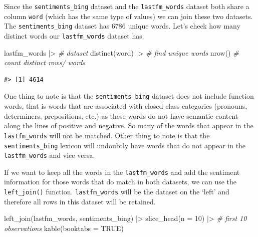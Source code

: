\documentclass[
  letterpaper,
]{scrbook}
\newenvironment{Shaded}{\begin{snugshade}}{\end{snugshade}}
\newcommand{\AttributeTok}[1]{\textcolor[rgb]{0.00,0.00,0.00}{#1}}
\newcommand{\CommentTok}[1]{\textcolor[rgb]{0.00,0.00,0.00}{\textit{#1}}}
\newcommand{\ConstantTok}[1]{\textcolor[rgb]{0.00,0.00,0.00}{#1}}
\newcommand{\DecValTok}[1]{\textcolor[rgb]{0.00,0.00,0.00}{#1}}
\newcommand{\FunctionTok}[1]{\textcolor[rgb]{0.00,0.00,0.00}{#1}}
\newcommand{\NormalTok}[1]{\textcolor[rgb]{0.00,0.00,0.00}{#1}}
\newcommand{\SpecialCharTok}[1]{\textcolor[rgb]{0.00,0.00,0.00}{#1}}
\begin{document}
Since the \texttt{sentiments\_bing} dataset and the
\texttt{lastfm\_words} dataset both share a column \texttt{word} (which
has the same type of values) we can join these two datasets. The
\texttt{sentiments\_bing} dataset has 6786 unique words. Let's check how
many distinct words our \texttt{lastfm\_words} dataset has.

\begin{Shaded}
\begin{Highlighting}[]
\NormalTok{lastfm\_words }\SpecialCharTok{|\textgreater{}} \CommentTok{\# dataset}
  \FunctionTok{distinct}\NormalTok{(word) }\SpecialCharTok{|\textgreater{}} \CommentTok{\# find unique words}
  \FunctionTok{nrow}\NormalTok{() }\CommentTok{\# count distinct rows/ words}
\end{Highlighting}
\end{Shaded}

\begin{verbatim}
#> [1] 4614
\end{verbatim}

One thing to note is that the \texttt{sentiments\_bing} dataset does not
include function words, that is words that are associated with
closed-class categories (pronouns, determiners, prepositions, etc.) as
these words do not have semantic content along the lines of positive and
negative. So many of the words that appear in the \texttt{lastfm\_words}
will not be matched. Other thing to note is that the
\texttt{sentiments\_bing} lexicon will undoubtly have words that do not
appear in the \texttt{lastfm\_words} and vice versa.

If we want to keep all the words in the \texttt{lastfm\_words} and add
the sentiment information for those words that do match in both
datasets, we can use the \texttt{left\_join()} function.
\texttt{lastfm\_words} will be the dataset on the `left' and therefore
all rows in this dataset will be retained.

\begin{Shaded}
\begin{Highlighting}[]
\FunctionTok{left\_join}\NormalTok{(lastfm\_words, sentiments\_bing) }\SpecialCharTok{|\textgreater{}} 
  \FunctionTok{slice\_head}\NormalTok{(}\AttributeTok{n =} \DecValTok{10}\NormalTok{) }\SpecialCharTok{|\textgreater{}} \CommentTok{\# first 10 observations}
  \FunctionTok{kable}\NormalTok{(}\AttributeTok{booktabs =} \ConstantTok{TRUE}\NormalTok{)}
\end{Highlighting}
\end{Shaded}
\end{document}
